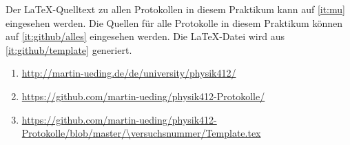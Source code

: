 \begin{appendix}
    Der \LaTeX-Quelltext zu allen Protokollen in diesem Praktikum kann auf
    \ref{it:mu} eingesehen werden. Die Quellen für alle Protokolle in diesem
    Praktikum können auf \ref{it:github/alles} eingesehen werden. Die
    \LaTeX-Datei wird aus \ref{it:github/template} generiert.

    \begin{enumerate}
        \item
            \label{it:mu}
            \url{http://martin-ueding.de/de/university/physik412/}
        \item
            \label{it:github/alles}
            \url{https://github.com/martin-ueding/physik412-Protokolle/}
        \item
            \label{it:github/template}
            \url{https://github.com/martin-ueding/physik412-Protokolle/blob/master/\versuchsnummer/Template.tex}
    \end{enumerate}
\end{appendix}


\FloatBarrier
\IfFileExists{\bibliographyfile}{
    
}{}



